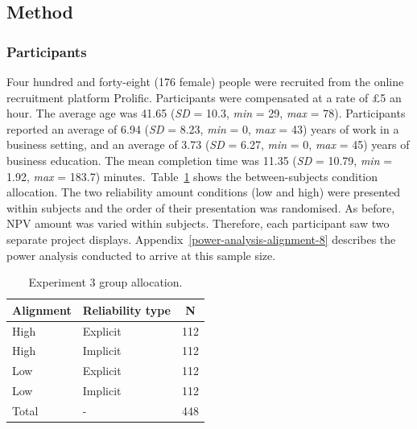 \documentclass[a4paper, nobind, dvipsnames]{templates/ociamthesis}
\theoremstyle{definition}
\theoremstyle{definition}
\theoremstyle{definition}
\theoremstyle{definition}
\theoremstyle{remark}
\begin{document}
\hypertarget{method-4}{%
\subsection{Method}\label{method-4}}

\hypertarget{participants-4}{%
\subsubsection{Participants}\label{participants-4}}

Four hundred and forty-eight (176 female) people were recruited from the online recruitment platform Prolific. Participants were compensated at a rate of £5 an hour. The average age was 41.65 (\emph{SD} = 10.3, \emph{min} = 29, \emph{max} = 78). Participants reported an average of 6.94 (\emph{SD} = 8.23, \emph{min} = 0, \emph{max} = 43) years of work in a business setting, and an average of 3.73 (\emph{SD} = 6.27, \emph{min} = 0, \emph{max} = 45) years of business education. The mean completion time was 11.35 (\emph{SD} = 10.79, \emph{min} = 1.92, \emph{max} = 183.7) minutes.~Table~\ref{tab:condition-allocation-alignment-8}
shows the between-subjects condition allocation. The two reliability amount
conditions (low and high) were presented within subjects and the order of their
presentation was randomised. As before, NPV amount was varied within subjects.
Therefore, each participant saw two separate project displays.
Appendix~\ref{power-analysis-alignment-8} describes the power analysis
conducted to arrive at this sample size.

\begin{table}[tbp]

\begin{center}
\begin{threeparttable}

\caption{\label{tab:condition-allocation-alignment-8}Experiment 3 group allocation.}

\begin{tabular}{lll}
\toprule
Alignment & \multicolumn{1}{c}{Reliability type} & \multicolumn{1}{c}{N}\\
\midrule
High & Explicit & 112\\
High & Implicit & 112\\
Low & Explicit & 112\\
Low & Implicit & 112\\
Total & - & 448\\
\bottomrule
\end{tabular}

\end{threeparttable}
\end{center}

\end{table}
\end{document}
